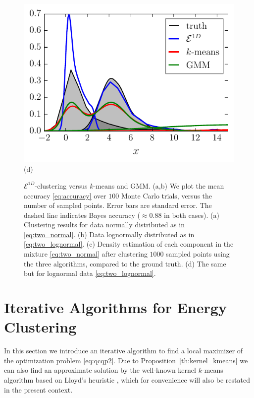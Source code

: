 \documentclass[aps,preprint,nofootinbib,floatfix]{revtex4-1}
\begin{document}
\begin{figure}
\begin{minipage}{0.49\textwidth}
~~~~~\includegraphics[width=.9\textwidth]{lognormal_density.pdf}\\[-1.5em](d)
\end{minipage}
\caption{
\label{fig:1d}
$\mathcal{E}^{1D}$-clustering versus $k$-means and GMM.
(a,b) We plot the mean accuracy
\eqref{eq:accuracy} over $100$ Monte Carlo trials, 
versus the number of sampled points. 
Error bars are standard error. The dashed line indicates 
Bayes accuracy ($\approx 0.88$ in both cases). (a) Clustering results for data normally distributed as in 
\eqref{eq:two_normal}.
(b) Data lognormally distributed as in \eqref{eq:two_lognormal}.
(c) Density estimation of each component in the mixture \eqref{eq:two_normal} 
after clustering $1000$ sampled points using the three algorithms, compared
to the ground truth. 
(d) The same but for lognormal data \eqref{eq:two_lognormal}.
}
\end{figure}


\section{Iterative Algorithms for Energy Clustering}
\label{sec:algo}

In this section we introduce an iterative algorithm to find a local
maximizer of the optimization problem \eqref{eq:qcqp2}. Due to 
Proposition~\ref{th:kernel_kmeans} we can also find an approximate
solution by the well-known kernel $k$-means algorithm based
on Lloyd's heuristic \cite{Dhillon2,Dhillon}, which 
for convenience will also be restated in the present context.
\end{document}
